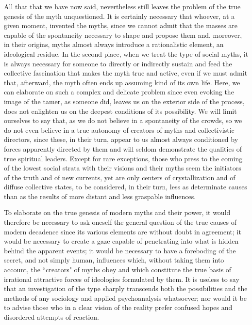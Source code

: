 All that that we have now said, nevertheless still leaves the problem of the true genesis of the myth unquestioned. It is certainly necessary that whoever, at a given moment, invented the myths, since we cannot admit that the masses are capable of the spontaneity necessary to shape and propose them and, moreover, in their origins, myths almost always introduce a rationalistic element, an ideological residue. In the second place, when we treat the type of social myths, it is always necessary for someone to directly or indirectly sustain and feed the collective fascination that makes the myth true and active, even if we must admit that, afterward, the myth often ends up assuming kind of its own life. Here, we can elaborate on such a complex and delicate problem since even evoking the image of the tamer, as someone did, leaves us on the exterior side of the process, does not enlighten us on the deepest conditions of its possibility. We will limit ourselves to say that, as we do not believe in a spontaneity of the crowds, so we do not even believe in a true autonomy of creators of myths and collectivistic directors, since these, in their turn, appear to us almost always conditioned by forces apparently directed by them and will seldom demonstrate the qualities of true spiritual leaders. Except for rare exceptions, those who press to the coming of the lowest social strata with their visions and their myths seem the initiators of the truth and of new currents, yet are only centers of crystallization and of diffuse collective states, to be considered, in their turn, less as determinate causes than as the results of more distant and less graspable influences.

To elaborate on the true genesis of modern myths and their power, it would therefore be necessary to ask oneself the general question of the true causes of modern decadence since its various elements are without doubt in agreement; it would be necessary to create a gaze capable of penetrating into what is hidden behind the apparent events; it would be necessary to have a foreboding of the secret, and not simply human, influences which, without taking them into account, the ``creators" of myths obey and which constitute the true basis of irrational attractive forces of ideologies formulated by them. It is useless to say that an investigation of the type sharply transcends both the possibilities and the methods of any sociology and applied psychoanalysis whatsoever; nor would it be to advise those who in a clear vision of the reality prefer confused hopes and disordered attempts of reaction.

